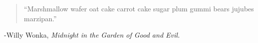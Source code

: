 
\chapter*{}

\begin{quote}
``Marshmallow wafer oat cake carrot cake sugar plum gummi bears jujubes marzipan.''

\end{quote}

\vspace{1in}
\hspace{2in}
-Willy Wonka, {\it Midnight in the Garden of Good and Evil.}